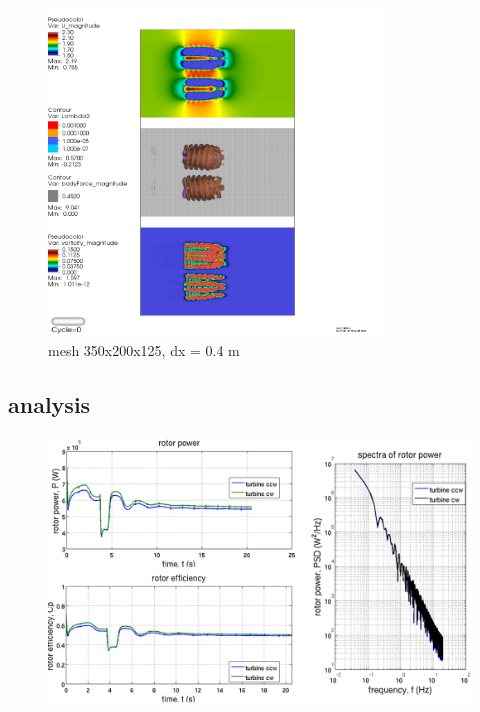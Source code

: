 \documentclass[xcolor=x11names,compress]{beamer}
\begin{document}
	\begin{frame}{}

		\begin{figure}[p]
		    \centering
    		\includegraphics[width=0.8\textwidth]{figures/fastFlume__dual-rotor-mesh=medium-3vars.png}
		    \caption{\scriptsize{mesh 350x200x125, dx = 0.4 m}}
		\end{figure}

	\end{frame}

\subsection{analysis}
	
	\begin{frame}{}
		
		\vspace{-20pt}

		\begin{figure}[p]
		    \centering
		    \includegraphics[width=1.08\textwidth]{figures/fastFlume__dual-rotor-mesh=TunedMedium-Analysis.png}
		\end{figure}

	\end{frame}
\end{document}
